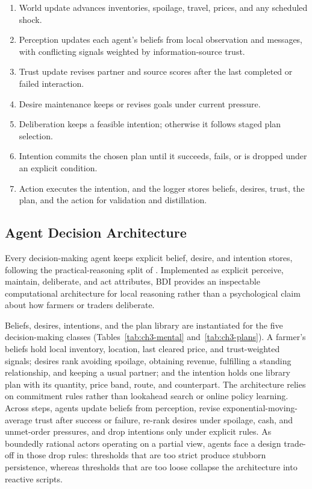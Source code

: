 \documentclass{icsthesis}
\begin{document}
\begin{mainmatter}
			\begin{enumerate}
				\item World update advances inventories, spoilage, travel, prices, and any scheduled shock.
				\item Perception updates each agent's beliefs from local observation and messages, with conflicting signals weighted by information-source trust.
				\item Trust update revises partner and source scores after the last completed or failed interaction.
				\item Desire maintenance keeps or revises goals under current pressure.
				\item Deliberation keeps a feasible intention; otherwise it follows staged plan selection.
				\item Intention commits the chosen plan until it succeeds, fails, or is dropped under an explicit condition.
				\item Action executes the intention, and the logger stores beliefs, desires, trust, the plan, and the action for validation and distillation.
			\end{enumerate}

		\subsection{Agent Decision Architecture}

			Every decision-making agent keeps explicit belief, desire, and intention stores, following the practical-reasoning split of \citet{RaoGeorgeff1995}. Implemented as explicit perceive, maintain, deliberate, and act attributes, BDI provides an inspectable computational architecture for local reasoning \citep{WooldridgeJennings1995,MacalNorth2010} rather than a psychological claim about how farmers or traders deliberate.

			Beliefs, desires, intentions, and the plan library are instantiated for the five decision-making classes (Tables~\ref{tab:ch3-mental} and~\ref{tab:ch3-plans}). A farmer's beliefs hold local inventory, location, last cleared price, and trust-weighted signals; desires rank avoiding spoilage, obtaining revenue, fulfilling a standing relationship, and keeping a usual partner; and the intention holds one library plan with its quantity, price band, route, and counterpart. The architecture relies on commitment rules rather than lookahead search or online policy learning. Across steps, agents update beliefs from perception, revise exponential-moving-average trust after success or failure, re-rank desires under spoilage, cash, and unmet-order pressures, and drop intentions only under explicit rules. As boundedly rational actors operating on a partial view, agents face a design trade-off in those drop rules: thresholds that are too strict produce stubborn persistence, whereas thresholds that are too loose collapse the architecture into reactive scripts.


\end{mainmatter}
\end{document}
